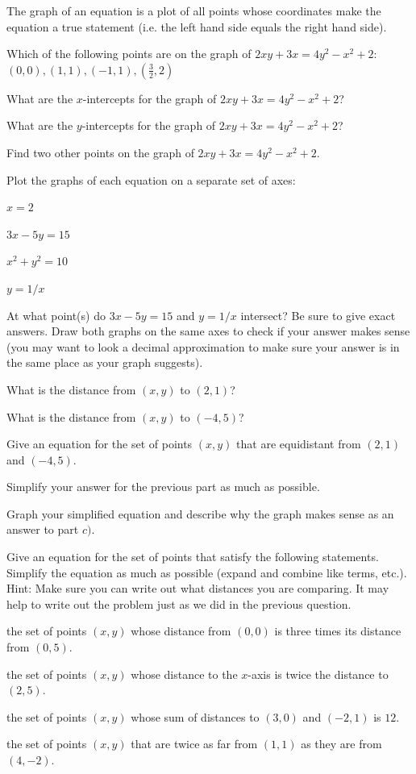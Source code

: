 \begin{info} The graph of an equation is a plot of all points whose coordinates make the equation a true statement (i.e. the left hand side equals the right hand side). \end{info}

\bq Which of the following points are on the graph of $2xy+3x=4y^2-x^2+2$: $(0,0), (1,1), (-1,1), (\frac{3}{2},2)$
\eq

\bq What are the $x$-intercepts for the graph of $2xy+3x=4y^2-x^2+2$?
\eq

\bq What are the $y$-intercepts for the graph of $2xy+3x=4y^2-x^2+2$?
\eq

\bq Find two other points on the graph of $2xy+3x=4y^2-x^2+2$.
\eq

\bq Plot the graphs of each equation on a separate set of axes:
\be
\item $x=2$
\item $3x-5y=15$
\item $x^2+y^2=10$
\item $y=1/x$
\ee
\eq

\bq At what point(s) do $3x-5y=15$ and $y=1/x$ intersect? Be sure to give exact answers. Draw both graphs on the same axes to check if your answer makes sense (you may want to look a decimal approximation to make sure your answer is in the same place as your graph suggests).
\eq

\bq
\be
\item What is the distance from $(x,y)$ to $(2,1)$?
\item What is the distance from $(x,y)$ to $(-4,5)$?
\item Give an equation for the set of points $(x,y)$ that are equidistant from $(2,1)$ and $(-4,5)$.
\item Simplify your answer for the previous part as much as possible.
\item Graph your simplified equation and describe why the graph makes sense as an answer to part $c)$.
\ee
\eq

\bq Give an equation for the set of points that satisfy the following statements. Simplify the equation as much as possible (expand and combine like terms, etc.). Hint: Make sure you can write out what distances you are comparing. It may help to write out the problem just as we did in the previous question.
\be
\item the set of points $(x,y)$ whose distance from $(0,0)$ is three times its distance from $(0,5)$.
\item the set of points $(x,y)$ whose distance to the $x$-axis is twice the distance to $(2,5)$.
\item the set of points $(x,y)$ whose sum of distances to $(3,0)$ and $(-2,1)$ is $12$.
\item the set of points $(x,y)$ that are twice as far from $(1,1)$ as they are from $(4,-2)$.
\ee
\eq

